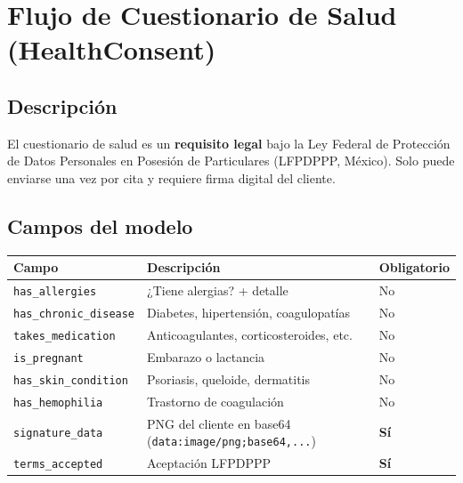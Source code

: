 \documentclass[11pt,a4paper]{article}
\begin{document}
\section{Flujo de Cuestionario de Salud (HealthConsent)}

\subsection{Descripción}

El cuestionario de salud es un \textbf{requisito legal} bajo la Ley Federal de
Protección de Datos Personales en Posesión de Particulares (LFPDPPP, México).
Solo puede enviarse una vez por cita y requiere firma digital del cliente.

\subsection{Campos del modelo}

\begin{center}
\begin{tabularx}{0.95\textwidth}{lXl}
\toprule
\rowcolor{blkMid}
\textcolor{blkGold}{\textbf{Campo}} &
\textcolor{blkGold}{\textbf{Descripción}} &
\textcolor{blkGold}{\textbf{Obligatorio}}\\
\midrule
\texttt{has\_allergies} & ¿Tiene alergias? + detalle & No\\
\rowcolor{blkMid}
\texttt{has\_chronic\_disease} & Diabetes, hipertensión, coagulopatías & No\\
\texttt{takes\_medication} & Anticoagulantes, corticosteroides, etc. & No\\
\rowcolor{blkMid}
\texttt{is\_pregnant} & Embarazo o lactancia & No\\
\texttt{has\_skin\_condition} & Psoriasis, queloide, dermatitis & No\\
\rowcolor{blkMid}
\texttt{has\_hemophilia} & Trastorno de coagulación & No\\
\texttt{signature\_data} & PNG del cliente en base64 (\texttt{data:image/png;base64,...}) & \textbf{Sí}\\
\rowcolor{blkMid}
\texttt{terms\_accepted} & Aceptación LFPDPPP & \textbf{Sí}\\
\bottomrule
\end{tabularx}
\end{center}
\end{document}
